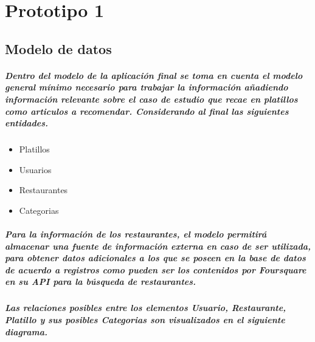 \chapter{Prototipo 1}
\section{Modelo de datos}
\paragraph{Dentro del modelo de la aplicación final se toma en cuenta el modelo general mínimo necesario para trabajar la información añadiendo información relevante sobre el caso de estudio que recae en platillos como articulos a recomendar. Considerando al final las siguientes entidades.}

\begin{itemize}
  \item Platillos
  \item Usuarios
  \item Restaurantes
  \item Categorias 
\end{itemize}

\paragraph{Para la información de los restaurantes, el modelo  permitirá almacenar una fuente de información externa en caso de ser utilizada, para obtener datos adicionales a los que se poseen en la base de datos de acuerdo a registros como pueden ser los contenidos por Foursquare en su API para la búsqueda de restaurantes.}

\paragraph{Las relaciones posibles entre los elementos Usuario, Restaurante, Platillo y sus posibles Categorias son visualizados en el siguiente diagrama.}

